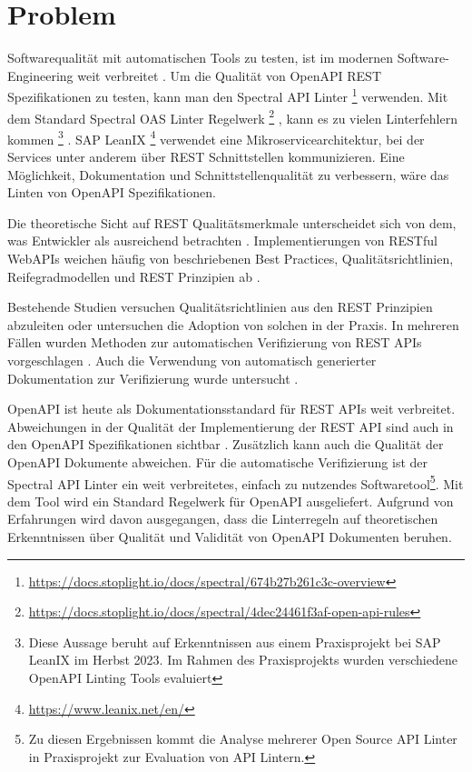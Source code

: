 \section{Problem}
Softwarequalität mit automatischen Tools zu testen, ist im modernen Software-Engineering weit verbreitet \parencite{tomasdottir_adoption_2018}. Um die Qualität von OpenAPI REST Spezifikationen zu testen, kann man den Spectral API Linter
    \footnote{\href{https://docs.stoplight.io/docs/spectral/674b27b261c3c-overview}{https://docs.stoplight.io/docs/spectral/674b27b261c3c-overview}}
verwenden. Mit dem Standard Spectral OAS Linter Regelwerk
    \footnote{\href{https://docs.stoplight.io/docs/spectral/4dec24461f3af-open-api-rules}{https://docs.stoplight.io/docs/spectral/4dec24461f3af-open-api-rules}}
, kann es zu vielen Linterfehlern kommen
    \footnote{Diese Aussage beruht auf Erkenntnissen aus einem Praxisprojekt bei SAP LeanIX im Herbst 2023. Im Rahmen des Praxisprojekts wurden verschiedene OpenAPI Linting Tools evaluiert}
. SAP LeanIX
    \footnote{\href{https://www.leanix.net/en/}{https://www.leanix.net/en/}}
verwendet eine Mikroservicearchitektur, bei der Services unter anderem über REST Schnittstellen kommunizieren. Eine Möglichkeit, Dokumentation und Schnittstellenqualität zu verbessern, wäre das Linten von OpenAPI Spezifikationen.

Die theoretische Sicht auf REST Qualitätsmerkmale unterscheidet sich von dem, was Entwickler als ausreichend betrachten \parencite{kotstein_which_2021}. Implementierungen von RESTful WebAPIs weichen häufig von beschriebenen Best Practices, Qualitätsrichtlinien, Reifegradmodellen und REST Prinzipien
ab \parencite{neumann_analysis_2021}.

Bestehende Studien versuchen Qualitätsrichtlinien aus den REST Prinzipien abzuleiten oder untersuchen die Adoption von solchen in der Praxis. In mehreren Fällen wurden Methoden zur automatischen Verifizierung von REST APIs vorgeschlagen \parencite{kotstein_which_2021}\parencite{palma_detection_2014}. Auch die Verwendung von automatisch generierter Dokumentation zur Verifizierung wurde untersucht \parencite{bogner_restruler_2024}\parencite{haupt_framework_2017}. 

OpenAPI ist heute als Dokumentationsstandard für REST APIs weit verbreitet. Abweichungen in der Qualität der Implementierung der REST API sind auch in den OpenAPI Spezifikationen sichtbar \parencite{vaziri_generating_2017}. Zusätzlich kann auch die Qualität der OpenAPI Dokumente abweichen. Für die automatische Verifizierung ist der Spectral API Linter ein weit verbreitetes, einfach zu nutzendes Softwaretool\footnote{Zu diesen Ergebnissen kommt die Analyse mehrerer Open Source API Linter in Praxisprojekt zur Evaluation von API Lintern.}. Mit dem Tool wird ein Standard Regelwerk für OpenAPI ausgeliefert. Aufgrund von Erfahrungen wird davon ausgegangen, dass die Linterregeln auf theoretischen Erkenntnissen über Qualität und Validität von OpenAPI Dokumenten beruhen.

